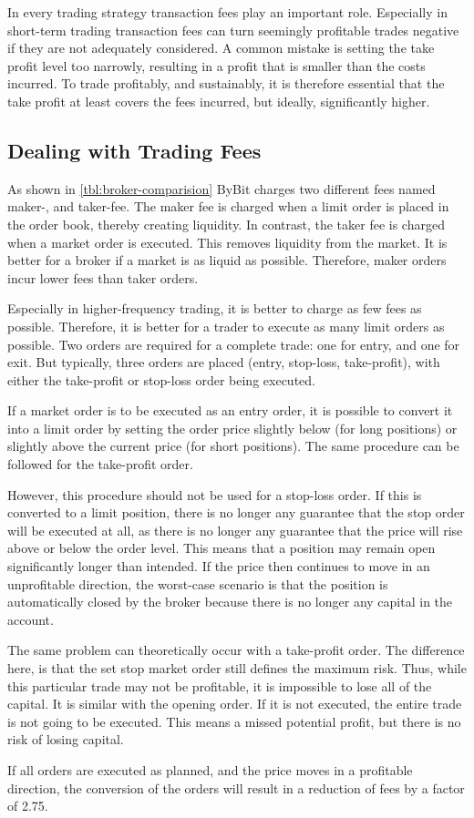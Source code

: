In every trading strategy transaction fees play an important role. Especially in short-term trading transaction fees can turn seemingly profitable trades negative if they are not adequately considered. A common mistake is setting the take profit level too narrowly, resulting in a profit that is smaller than the costs incurred. To trade profitably, and sustainably, it is therefore essential that the take profit at least covers the fees incurred, but ideally, significantly higher.

\subsection{Dealing with Trading Fees}
\label{chap:dealing-with-trading-fees}

As shown in \autoref{tbl:broker-comparision} ByBit charges two different fees named maker-, and taker-fee. The maker fee is charged when a limit order is placed in the order book, thereby creating liquidity. In contrast, the taker fee is charged when a market order is executed. This removes liquidity from the market. It is better for a broker if a market is as liquid as possible. Therefore, maker orders incur lower fees than taker orders.

Especially in higher-frequency trading, it is better to charge as few fees as possible. Therefore, it is better for a trader to execute as many limit orders as possible. Two orders are required for a complete trade: one for entry, and one for exit. But typically, three orders are placed (entry, stop-loss, take-profit), with either the take-profit or stop-loss order being executed.

If a market order is to be executed as an entry order, it is possible to convert it into a limit order by setting the order price slightly below (for long positions) or slightly above the current price (for short positions). The same procedure can be followed for the take-profit order.

However, this procedure should not be used for a stop-loss order. If this is converted to a limit position, there is no longer any guarantee that the stop order will be executed at all, as there is no longer any guarantee that the price will rise above or below the order level. This means that a position may remain open significantly longer than intended. If the price then continues to move in an unprofitable direction, the worst-case scenario is that the position is automatically closed by the broker because there is no longer any capital in the account.

The same problem can theoretically occur with a take-profit order. The difference here, is that the set stop market order still defines the maximum risk. Thus, while this particular trade may not be profitable, it is impossible to lose all of the capital. It is similar with the opening order. If it is not executed, the entire trade is not going to be executed. This means a missed potential profit, but there is no risk of losing capital.

If all orders are executed as planned, and the price moves in a profitable direction, the conversion of the orders will result in a reduction of fees by a factor of 2.75.